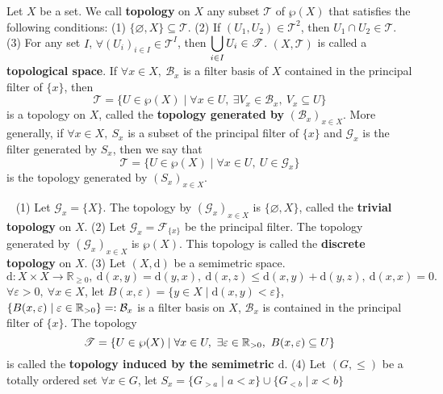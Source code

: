 \begin{definitionenv}
    Let $X$ be a set. We call \textbf{topology} on $X$ any subset $\mathscr{T}$ of $\wp(X)$ that satisfies the following conditions:
     \newline
    (1) $\{\varnothing, X\} \subseteq \mathscr{T}$.
    \newline
    (2) If $(U_1,U_2)\in \mathscr{T}^2$, then $U_1\cap U_2\in \mathscr{T}$.
    \newline
    (3) For any set $I$,  $ \forall \left(U_i\right)_{i\in I}\in \mathscr{T}^I$, then $\displaystyle \bigcup_{i\in I}U_i\in \mathscr{T}$.
    \newline
    $(X,\mathscr{T})$ is called a \textbf{topological space}.
    \newline
    If $\forall x\in X,\ \mathcal{B}_x$ is a filter basis of $X$ contained in the principal filter of $\{x\}$, then 
    $$\mathscr{T}=\{U\in \wp(X)\mid \forall x\in U,\ \exists V_x\in \mathcal{B}_x,\ V_x\subseteq U\}$$
    is a topology on $X$, called the \textbf{topology generated by} $(\mathcal{B}_x)_{x\in X}$. More generally, if $\forall x\in X,\ S_x $ is a subset of the principal filter of $\{x\}$ and $\mathcal{G}_x$ is the filter generated by $S_x$, then we say that 
    $$\mathscr{T}=\{U\in\wp(X)\mid \forall x\in U,\ U\in \mathcal{G}_x\}$$
    is the topology generated by $(S_x)_{x\in X}$.

\end{definitionenv}
\begin{exampleenv}
    \ \newline
    (1) Let $\mathcal{G}_x=\{X\}$. The topology by $\left(\mathcal{G}_x\right)_{x\in X}$ is $\{\varnothing,X\}$, called the \textbf{trivial topology} on $X$.  
    \newline
    (2) Let $\mathcal{G}_x=\mathcal{F}_{\{x\}}$ be the principal filter. The topology generated by $\left(\mathcal{G}_x\right)_{x\in X}$ is $\wp(X)$. This topology is called the \textbf{discrete topology} on $X$.
    \newline
    (3) Let $(X,\mathrm{d})$ be a semimetric space. 
    $$\mathrm{d}:X\times X\longrightarrow \mathbb{R}_{\ge 0},\  \mathrm{d}(x,y)=\mathrm{d}(y,x),\ \mathrm{d}(x,z)\le \mathrm{d}(x,y)+\mathrm{d}(y,z),\ \mathrm{d}(x,x)=0.$$
    $\forall \varepsilon>0,\ \forall x\in X$, let $B(x,\varepsilon)=\{y\in X\mid \mathrm{d}(x,y)<\varepsilon\}$, $\{B(x,\varepsilon)\mid \varepsilon\in \mathbb{R}_{>0}\}=: \mathcal{B}_x$ is a filter basis on $X$, $\mathcal{B}_x$ is contained in the principal filter of $\{x\}$. The topology 
    $$\mathscr{T}=\{U\in \wp(X)\mid \forall x\in U,\ \exists \varepsilon\in \RR_{>0},\ B(x,\varepsilon)\subseteq U\}$$
    is called the \textbf{topology induced by the semimetric $\mathrm{d}$}.
    \newline
    (4) Let $(G,\le )$ be a totally ordered set $\forall x\in G$, let $S_x=\{G_{>a}\mid a<x\}\cup \{G_{<b}\mid x<b\}$
\end{exampleenv}

